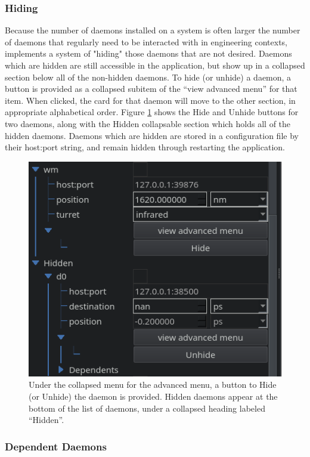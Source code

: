 \subsubsection{Hiding}

Because the number of daemons installed on a system is often larger the number of daemons that regularly need to be interacted with in engineering contexts, \yaqcqtpy{} implements a system of "hiding" those daemons that are not desired.
Daemons which are hidden are still accessible in the application, but show up in a collapsed section below all of the non-hidden daemons.
To hide (or unhide) a daemon, a button is provided as a collapsed subitem of the ``view advanced menu'' for that item.
When clicked, the card for that daemon will move to the other section, in appropriate alphabetical order.
Figure \ref{yaq:fig:hiding} shows the Hide and Unhide buttons for two daemons, along with the Hidden collapsable section which holds all of the hidden daemons.
Daemons which are hidden are stored in a configuration file by their host:port string, and remain hidden through restarting the application.


\begin{figure}
\includegraphics[width=4.5in]{"yaq/images/hiding"}
\caption[\yaqcqtpy{} Hiding]{
	Under the collapsed menu for the advanced menu, a button to Hide (or Unhide) the daemon is provided.
	Hidden daemons appear at the bottom of the list of daemons, under a collapsed heading labeled ``Hidden''.
}
\label{yaq:fig:hiding}
\end{figure}

\subsubsection{Dependent Daemons}

